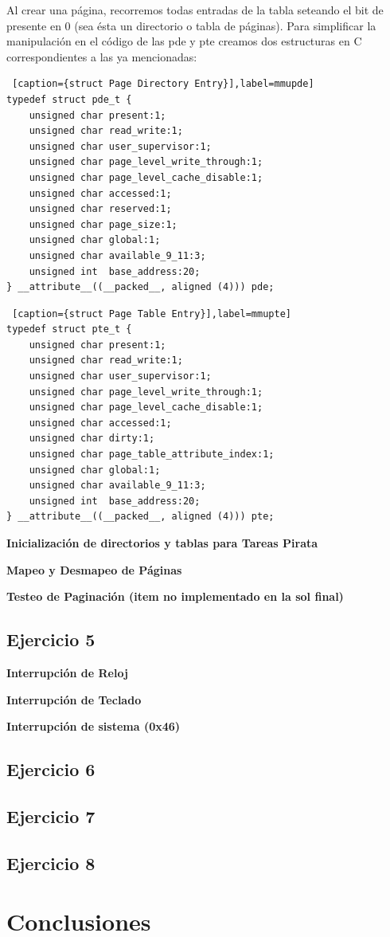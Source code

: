 \documentclass[a4paper]{article}
\begin{document}
\par Al crear una página, recorremos todas entradas de la tabla seteando el bit de presente en 0 (sea ésta un directorio o tabla de páginas). Para simplificar la manipulación en el código de las pde y pte creamos dos estructuras en C correspondientes a las ya mencionadas: 

\begin{lstlisting} [caption={struct Page Directory Entry}],label=mmupde] 
typedef struct pde_t {
    unsigned char present:1;
    unsigned char read_write:1;
    unsigned char user_supervisor:1;
    unsigned char page_level_write_through:1;
    unsigned char page_level_cache_disable:1;
    unsigned char accessed:1;
    unsigned char reserved:1;
    unsigned char page_size:1;
    unsigned char global:1;
    unsigned char available_9_11:3;
    unsigned int  base_address:20;
} __attribute__((__packed__, aligned (4))) pde;
\end{lstlisting}

\begin{lstlisting} [caption={struct Page Table Entry}],label=mmupte] 
typedef struct pte_t {
    unsigned char present:1;
    unsigned char read_write:1;
    unsigned char user_supervisor:1;
    unsigned char page_level_write_through:1;
    unsigned char page_level_cache_disable:1;
    unsigned char accessed:1;
    unsigned char dirty:1;
    unsigned char page_table_attribute_index:1;
    unsigned char global:1;
    unsigned char available_9_11:3;
    unsigned int  base_address:20;
} __attribute__((__packed__, aligned (4))) pte;
\end{lstlisting}

\textbf{Inicialización de directorios y tablas para Tareas Pirata}

\textbf{Mapeo y Desmapeo de Páginas}

\textbf{Testeo de Paginación (item no implementado en la sol final)}

\subsection{Ejercicio 5}

\textbf{Interrupción de Reloj}

\textbf{Interrupción de Teclado}

\textbf{Interrupción de sistema (0x46)}

\subsection{Ejercicio 6}

\subsection{Ejercicio 7}


\subsection{Ejercicio 8}

\newpage

\section{Conclusiones}
\end{document}
